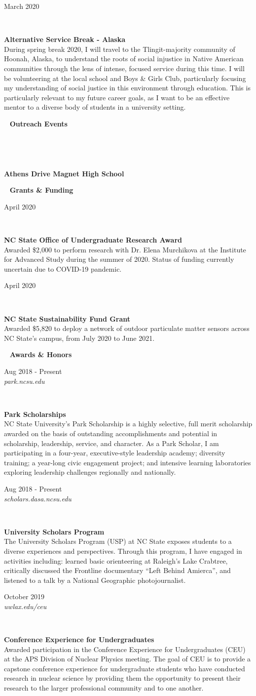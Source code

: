 \documentclass[8pt]{article}
\def \primarycolor   {spacecadet}
\def \tertiarycolor  {airforceblue} %
\def \titlerectmin{0.15cm}
\def \titlerectmax{0.35cm}
\def \leftcolwidth{3.05cm}
\newcommand{\cvheader}[1]{
    \tikz{\fill [\primarycolor] (0,\titlerectmin) rectangle (\leftcolwidth,\titlerectmax);} \ 
    \textcolor{\primarycolor}{ \large{\textbf{#1}} } 
}
\newcommand{\cventry}[4]{
    \begin{minipage}[t]{\leftcolwidth} 
        \small{
            \begin{flushright}
                #2\\
                \textcolor{\tertiarycolor}{\textit{#4}}
            \end{flushright}
        }
    \end{minipage} \ \
    \begin{minipage}[t]{\linewidth-\leftcolwidth} \normalsize{\textbf{#1} \\ #3} \end{minipage}
} %
\begin{document}
\cventry{Alternative Service Break - Alaska}{March 2020}{During spring break 2020, I will travel to the Tlingit-majority community of Hoonah, Alaska, to understand the roots of social injustice in Native American communities through the lens of intense, focused service during this time. I will be volunteering at the local school and Boys \& Girls Club, particularly focusing my understanding of social justice in this environment through education. This is particularly relevant to my future career goals, as I want to be an effective mentor to a diverse body of students in a university setting.
}{}

\cvheader{Outreach Events}

\cventry{Athens Drive Magnet High School}{}{}{}

\cvheader{Grants \& Funding}

\cventry{NC State Office of Undergraduate Research Award}{April 2020}{Awarded \$2,000 to perform research with Dr. Elena Murchikova at the Institute for Advanced Study during the summer of 2020. Status of funding currently uncertain due to COVID-19 pandemic.}{}

\cventry{NC State Sustainability Fund Grant}{April 2020}{Awarded \$5,820 to deploy a network of outdoor particulate matter sensors across NC State's campus, from July 2020 to June 2021.}{}

\cvheader{Awards \& Honors}

\cventry{Park Scholarships}{Aug 2018 - Present}{NC State University's Park Scholarship is a highly selective, full merit scholarship awarded on the basis of outstanding accomplishments and potential in scholarship, leadership, service, and character. As a Park Scholar, I am participating in a four-year, executive-style leadership academy; diversity training; a year-long civic engagement project; and intensive learning laboratories exploring leadership challenges regionally and nationally.}{park.ncsu.edu}

\cventry{University Scholars Program}{Aug 2018 - Present}{The University Scholars Program (USP) at NC State exposes students to a diverse experiences and perspectives. Through this program, I have engaged in activities including: learned basic orienteering at Raleigh’s Lake Crabtree, critically discussed the Frontline documentary “Left Behind Amierca”, and listened to a talk by a National Geographic photojournalist.}{scholars.dasa.ncsu.edu}

\cventry{Conference Experience for Undergraduates}{October 2019}{Awarded participation in the Conference Experience for Undergraduates (CEU) at the APS Division of Nuclear Physics meeting. The goal of CEU is to provide a capstone conference experience for undergraduate students who have conducted research in nuclear science by providing them the opportunity to present their research to the larger professional community and to one another.}{uwlax.edu/ceu}
\end{document}
